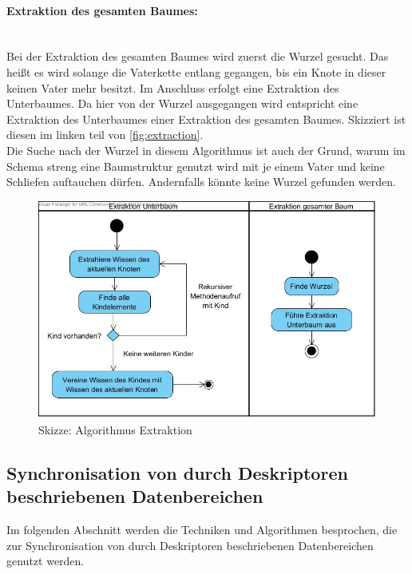 \documentclass[a4paper]{article}
\begin{document}
	\paragraph{Extraktion des gesamten Baumes:}\mbox{} \\
	
	Bei der Extraktion des gesamten Baumes wird zuerst die Wurzel gesucht. Das heißt
	es wird solange die Vaterkette entlang gegangen, bis ein Knote in dieser keinen 		Vater mehr besitzt. Im Anschluss erfolgt eine Extraktion des Unterbaumes. Da
	hier von der Wurzel ausgegangen wird entspricht eine Extraktion des Unterbaumes
	einer Extraktion des gesamten Baumes. Skizziert ist diesen im linken teil von
	\autoref{fig:extraction}. \\
	
	Die Suche nach der Wurzel in diesem Algorithmus ist auch der Grund, warum
	im Schema streng eine Baumstruktur genutzt wird mit je einem Vater und keine
	Schliefen auftauchen dürfen. Andernfalls könnte keine Wurzel gefunden werden.
	
	\begin{figure}[H]
		\includegraphics[width=\linewidth]{../Bilder/extraction.jpg}
		\caption{Skizze: Algorithmus Extraktion}
		\label{fig:extraction}
	\end{figure}	
	
	\newpage
	\subsection{Synchronisation von durch Deskriptoren beschriebenen Datenbereichen}	
	
	Im folgenden Abschnitt werden die Techniken und Algorithmen besprochen, die
	zur Synchronisation von durch Deskriptoren beschriebenen Datenbereichen genutzt
	werden.
	
\end{document}
